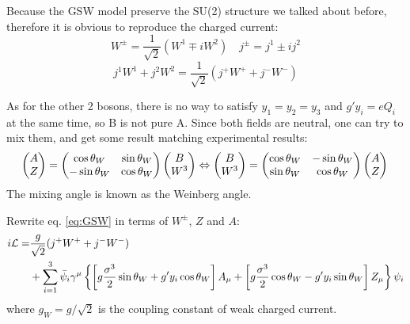 Because the GSW model preserve the SU(2) structure we talked about before, 
therefore it is obvious to reproduce the charged current:
\begin{equation}
    W^\pm = \frac{1}{\sqrt{2}}(W^1 \mp iW^2)	\quad
    j^\pm = j^1 \pm ij^2
\end{equation}
\begin{equation}
    j^1W^1 + j^2W^2 = \frac{1}{\sqrt{2}}(j^+W^+ + j^-W^-)
\end{equation}

As for the other 2 bosons, there is no way to satisfy $y_1 = y_2 = y_3$ and 
$g'y_i = eQ_i$ at the same time, so B is not pure A. 
Since both fields are neutral, one can try to mix them, 
and get some result matching experimental results:
\begin{equation}
    \begin{pmatrix}
	A   \\
	Z   \\
    \end{pmatrix}
    =
    \begin{pmatrix}
	\cos\theta_W	& \sin\theta_W	\\
	-\sin\theta_W	& \cos\theta_W	\\
    \end{pmatrix}
    \begin{pmatrix}
	B   \\
	W^3 \\
    \end{pmatrix} 
    \Leftrightarrow
    \begin{pmatrix}
	B   \\
	W^3 \\
    \end{pmatrix}
    =
    \begin{pmatrix}
	\cos\theta_W	& -\sin\theta_W	\\
	\sin\theta_W	& \cos\theta_W	\\
    \end{pmatrix}
    \begin{pmatrix}
	A   \\
	Z	\\
    \end{pmatrix} \\
\end{equation}
The mixing angle is known as the Weinberg angle. 

Rewrite eq. \ref{eq:GSW} in terms of $W^\pm$, $Z$ and $A$:
\begin{equation}
    \begin{aligned}
	i\mathcal{L} = &\frac{g}{\sqrt{2}}(j^+W^+ + j^-W^-)	\\
	    &+ \sum_{i=1}^3\bar{\psi}_i\gamma^\mu \left\{ 
		\left[g\frac{\sigma^3}{2}\sin\theta_W + g'y_i\cos\theta_W\right] A_\mu
		+ \left[ g\frac{\sigma^3}{2}\cos\theta_W - g'y_i\sin\theta_W \right] Z_\mu 
	    \right\} \psi_i
    \end{aligned}
\end{equation}
where $g_W = g/\sqrt{2}$ is the coupling constant of weak charged current.

